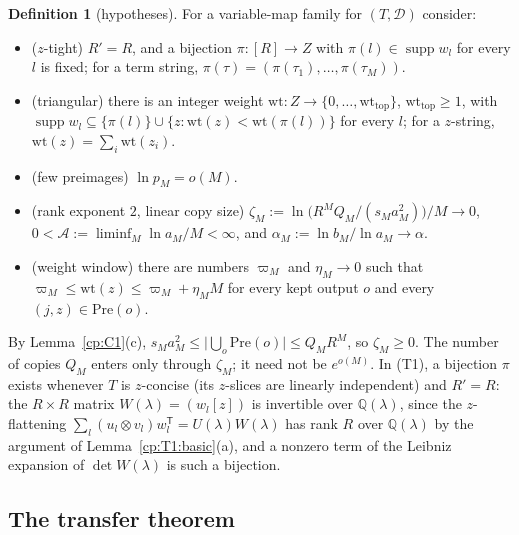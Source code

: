 \documentclass[11pt]{article}
\theoremstyle{definition}
\newtheorem{definition}[theorem]{Definition}
\theoremstyle{remark}
\providecommand{\Q}{\mathbb{Q}}
\newcommand{\abs}[1]{\lvert #1\rvert}
\DeclareMathOperator{\supp}{supp}
\newcommand{\Tcond}[1]{\textup{(T#1)}}        %
\newcommand{\Acs}{\mathcal A}                %
\newcommand{\wt}{\mathrm{wt}}                %
\newcommand{\wtop}{\mathrm{wt}_{\mathrm{top}}}
\newcommand{\Pre}{\mathrm{Pre}}              %
\begin{document}
\begin{definition}[hypotheses]\label{cp:C2:hyp}
For a variable-map family for $(T,\mathcal D)$ consider:
\begin{itemize}
\item[\Tcond1] ($z$-tight) $R'=R$, and a bijection $\pi\colon[R]\to Z$ with $\pi(l)\in\supp w_l$ for every $l$ is fixed; for a term string, $\pi(\tau)=(\pi(\tau_1),\dots,\pi(\tau_M))$.
\item[\Tcond2] (triangular) there is an integer weight $\wt\colon Z\to\{0,\dots,\wtop\}$, $\wtop\ge1$, with $\supp w_l\subseteq\{\pi(l)\}\cup\{z:\wt(z)<\wt(\pi(l))\}$ for every $l$; for a $z$-string, $\wt(z)=\sum_i\wt(z_i)$.
\item[\Tcond3] (few preimages) $\ln p_M=o(M)$.
\item[\Tcond4] (rank exponent $2$, linear copy size) $\zeta_M:=\ln\bigl(R^MQ_M/(s_Ma_M^2)\bigr)/M\to0$, $0<\Acs:=\liminf_M\ln a_M/M<\infty$, and $\alpha_M:=\ln b_M/\ln a_M\to\alpha$.
\item[\Tcond5] (weight window) there are numbers $\varpi_M$ and $\eta_M\to0$ such that $\varpi_M\le\wt(z)\le\varpi_M+\eta_MM$ for every kept output $o$ and every $(j,z)\in\Pre(o)$.
\end{itemize}
\end{definition}

By Lemma~\ref{cp:C1}(c), $s_Ma_M^2\le\abs{\bigcup_o\Pre(o)}\le Q_MR^M$, so $\zeta_M\ge0$. The number of copies $Q_M$ enters only through $\zeta_M$; it need not be $e^{o(M)}$. In \Tcond1, a bijection $\pi$ exists whenever $T$ is $z$-concise (its $z$-slices are linearly independent) and $R'=R$: the $R\times R$ matrix $W(\lambda)=(w_l[z])$ is invertible over $\Q(\lambda)$, since the $z$-flattening $\sum_l(u_l\otimes v_l)w_l^{\mathsf T}=U(\lambda)W(\lambda)$ has rank $R$ over $\Q(\lambda)$ by the argument of Lemma~\ref{cp:T1:basic}(a), and a nonzero term of the Leibniz expansion of $\det W(\lambda)$ is such a bijection.

\subsection{The transfer theorem}\label{cp:sec:tr:T}
\end{document}
